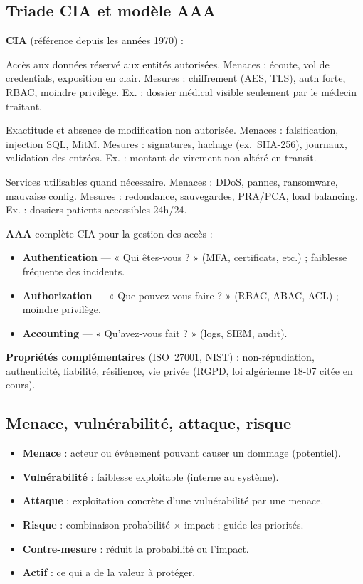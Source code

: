 \documentclass[11pt,a4paper]{article}
\begin{document}
\subsection{Triade CIA et modèle AAA}
\textbf{CIA} (référence depuis les années 1970) :
\begin{description}[style=nextline]
  \item[Confidentialité] Accès aux données réservé aux entités autorisées. Menaces : écoute, vol de credentials, exposition en clair. Mesures : chiffrement (AES, TLS), auth forte, RBAC, moindre privilège. Ex. : dossier médical visible seulement par le médecin traitant.
  \item[Intégrité] Exactitude et absence de modification non autorisée. Menaces : falsification, injection SQL, MitM. Mesures : signatures, hachage (ex.\ SHA-256), journaux, validation des entrées. Ex. : montant de virement non altéré en transit.
  \item[Disponibilité] Services utilisables quand nécessaire. Menaces : DDoS, pannes, ransomware, mauvaise config. Mesures : redondance, sauvegardes, PRA/PCA, load balancing. Ex. : dossiers patients accessibles 24h/24.
\end{description}

\textbf{AAA} complète CIA pour la gestion des accès :
\begin{itemize}[nosep]
  \item \textbf{Authentication} — « Qui êtes-vous ? » (MFA, certificats, etc.) ; faiblesse fréquente des incidents.
  \item \textbf{Authorization} — « Que pouvez-vous faire ? » (RBAC, ABAC, ACL) ; moindre privilège.
  \item \textbf{Accounting} — « Qu'avez-vous fait ? » (logs, SIEM, audit).
\end{itemize}

\textbf{Propriétés complémentaires} (ISO~27001, NIST) : non-répudiation, authenticité, fiabilité, résilience, vie privée (RGPD, loi algérienne 18-07 citée en cours).

\subsection{Menace, vulnérabilité, attaque, risque}
\begin{itemize}[nosep]
  \item \textbf{Menace} : acteur ou événement pouvant causer un dommage (potentiel).
  \item \textbf{Vulnérabilité} : faiblesse exploitable (interne au système).
  \item \textbf{Attaque} : exploitation concrète d'une vulnérabilité par une menace.
  \item \textbf{Risque} : combinaison probabilité $\times$ impact ; guide les priorités.
  \item \textbf{Contre-mesure} : réduit la probabilité ou l'impact.
  \item \textbf{Actif} : ce qui a de la valeur à protéger.
\end{itemize}
\end{document}

